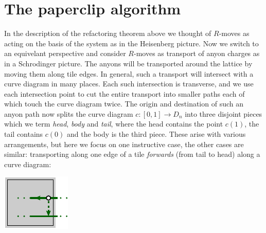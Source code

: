 \documentclass[aps, prl, letterpaper, twocolumn, superscriptaddress, notitlepage, 10pt]{revtex4-1}
\begin{document}
%



%
%

\section{The paperclip algorithm}

In the description of the refactoring theorem
above we thought of $R$-moves as acting on the basis of
the system as in the Heisenberg picture.
Now we switch to an equivelant perspective and
consider $R$-moves as transport of anyon charges
as in a Schrodinger picture.
The anyons will be transported around the lattice
by moving them along tile edges.
In general, such a transport will intersect with a
curve diagram in many places.
Each such intersection is transverse,
and we use each intersection point to cut
the entire transport into smaller paths each of
which touch the curve diagram twice.
The origin and destination of such an anyon path
now splits the curve diagram $c:[0, 1]\to D_n$ 
into three disjoint pieces which we term
\emph{head}, \emph{body} and \emph{tail}, where
the head contains the point $c(1)$, the tail
contains $c(0)$ and the body is the third piece.
These arise with various arrangements, but here
we focus on one instructive case, the
other cases are similar:
transporting along one edge of a tile \emph{forwards} 
(from tail to head) along a curve diagram:
\begin{center}
\includegraphics[]{pic-move-anyon.pdf}
\end{center}
\end{document}
